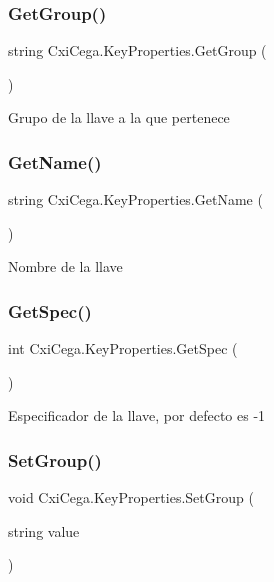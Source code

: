 \subsubsection{Get\+Group()}
{\footnotesize\ttfamily string Cxi\+Cega.\+Key\+Properties.\+Get\+Group (\begin{DoxyParamCaption}{ }\end{DoxyParamCaption})}



Grupo de la llave a la que pertenece 

\mbox{\label{class_cxi_cega_1_1_key_properties_aebf03cf7c3d7131230495b21d1b82238}} 
\subsubsection{Get\+Name()}
{\footnotesize\ttfamily string Cxi\+Cega.\+Key\+Properties.\+Get\+Name (\begin{DoxyParamCaption}{ }\end{DoxyParamCaption})}



Nombre de la llave 

\mbox{\label{class_cxi_cega_1_1_key_properties_acca1b269518577f3b41557281c5d5d90}} 
\subsubsection{Get\+Spec()}
{\footnotesize\ttfamily int Cxi\+Cega.\+Key\+Properties.\+Get\+Spec (\begin{DoxyParamCaption}{ }\end{DoxyParamCaption})}



Especificador de la llave, por defecto es -\/1 

\mbox{\label{class_cxi_cega_1_1_key_properties_a7214ac484303a33fab2bc35033b08820}} 
\subsubsection{Set\+Group()}
{\footnotesize\ttfamily void Cxi\+Cega.\+Key\+Properties.\+Set\+Group (\begin{DoxyParamCaption}\item[{string}]{value }\end{DoxyParamCaption})}



